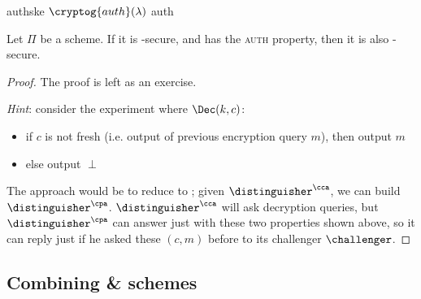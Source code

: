 \begin{cryptogame}
    {authske}
    {$\cryptog{auth}(\lambda)$}
    {auth}


    \cseqbeginloop
    \cseqendloop

    \cseqdelay


\end{cryptogame} 

\begin{theorem}
    Let $\Pi$ be a \ske{} scheme. If it is \cpa-secure, and has the \textsc{auth} property, then it is also \cca-secure.
\end{theorem}

\begin{proof} The proof is left as an exercise.

    \emph{Hint}: consider the experiment where $\Dec(k, c)$:

    \begin{itemize}
        \item if $c$ is not fresh (i.e. output of previous encryption query $m$),  then output $m$
        \item else output $\perp$
    \end{itemize}
    
    The approach would be to reduce \cca{} to \cpa; given $\distinguisher^{\cca}$, we can build $\distinguisher^{\cpa}$. $\distinguisher^{\cca}$ will ask decryption queries, but $\distinguisher^{\cpa}$ can answer just with these two properties shown above, so it can reply just if he asked these $(c, m)$ before to its challenger $\challenger$.

\end{proof}

\subsection{Combining \ske{} \& \mac{} schemes}


